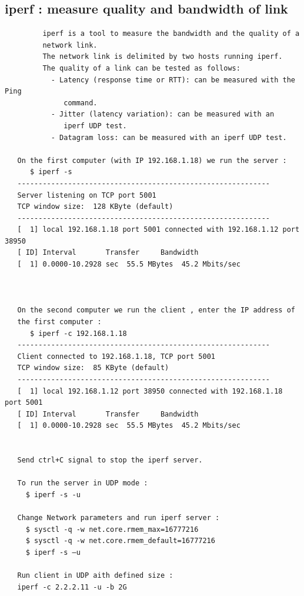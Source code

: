 \documentclass[a4paper,12pt]{article}
\begin{document}
\subsection{iperf : measure quality and bandwidth of link}
\begin{verbatim}
         iperf is a tool to measure the bandwidth and the quality of a 
         network link.
         The network link is delimited by two hosts running iperf.
         The quality of a link can be tested as follows:
           - Latency (response time or RTT): can be measured with the Ping  
              command.
           - Jitter (latency variation): can be measured with an 
              iperf UDP test.
           - Datagram loss: can be measured with an iperf UDP test.
           
   On the first computer (with IP 192.168.1.18) we run the server : 
      $ iperf -s
   ------------------------------------------------------------
   Server listening on TCP port 5001
   TCP window size:  128 KByte (default)
   ------------------------------------------------------------
   [  1] local 192.168.1.18 port 5001 connected with 192.168.1.12 port 38950
   [ ID] Interval       Transfer     Bandwidth
   [  1] 0.0000-10.2928 sec  55.5 MBytes  45.2 Mbits/sec


   
   On the second computer we run the client , enter the IP address of
   the first computer : 
      $ iperf -c 192.168.1.18
   ------------------------------------------------------------
   Client connected to 192.168.1.18, TCP port 5001
   TCP window size:  85 KByte (default)
   ------------------------------------------------------------
   [  1] local 192.168.1.12 port 38950 connected with 192.168.1.18 port 5001
   [ ID] Interval       Transfer     Bandwidth
   [  1] 0.0000-10.2928 sec  55.5 MBytes  45.2 Mbits/sec        
    
    
   Send ctrl+C signal to stop the iperf server.
   
   To run the server in UDP mode : 
     $ iperf -s -u 
   
   Change Network parameters and run iperf server : 
     $ sysctl -q -w net.core.rmem_max=16777216
     $ sysctl -q -w net.core.rmem_default=16777216
     $ iperf -s –u   
   
   Run client in UDP aith defined size : 
   iperf -c 2.2.2.11 -u -b 2G
   
           
\end{verbatim}
\end{document}

